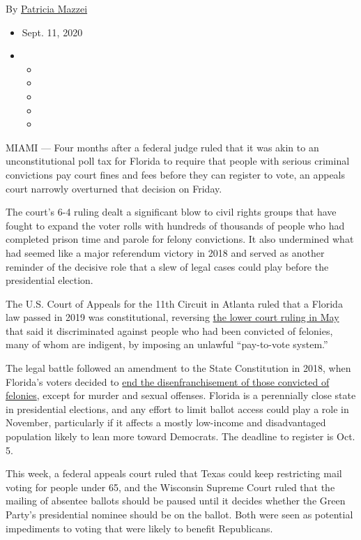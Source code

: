 By \href{https://www.nytimes3xbfgragh.onion/by/patricia-mazzei}{Patricia
Mazzei}

\begin{itemize}
\item
  Sept. 11, 2020
\item
  \begin{itemize}
  \item
  \item
  \item
  \item
  \item
  \end{itemize}
\end{itemize}

MIAMI --- Four months after a federal judge ruled that it was akin to an
unconstitutional poll tax for Florida to require that people with
serious criminal convictions pay court fines and fees before they can
register to vote, an appeals court narrowly overturned that decision on
Friday.

The court's 6-4 ruling dealt a significant blow to civil rights groups
that have fought to expand the voter rolls with hundreds of thousands of
people who had completed prison time and parole for felony convictions.
It also undermined what had seemed like a major referendum victory in
2018 and served as another reminder of the decisive role that a slew of
legal cases could play before the presidential election.

The U.S. Court of Appeals for the 11th Circuit in Atlanta ruled that a
Florida law passed in 2019 was constitutional, reversing
\href{https://www.nytimes3xbfgragh.onion/2020/05/24/us/florida-felon-voting-court-judge-ruling.html}{the
lower court ruling in May} that said it discriminated against people who
had been convicted of felonies, many of whom are indigent, by imposing
an unlawful ``pay-to-vote system.''

The legal battle followed an amendment to the State Constitution in
2018, when Florida's voters decided to
\href{https://www.nytimes3xbfgragh.onion/2018/11/07/us/florida-felon-voting-rights.html}{end
the disenfranchisement of those convicted of felonies}, except for
murder and sexual offenses. Florida is a perennially close state in
presidential elections, and any effort to limit ballot access could play
a role in November, particularly if it affects a mostly low-income and
disadvantaged population likely to lean more toward Democrats. The
deadline to register is Oct. 5.

This week, a federal appeals court ruled that Texas could keep
restricting mail voting for people under 65, and the Wisconsin Supreme
Court ruled that the mailing of absentee ballots should be paused until
it decides whether the Green Party's presidential nominee should be on
the ballot. Both were seen as potential impediments to voting that were
likely to benefit Republicans.

